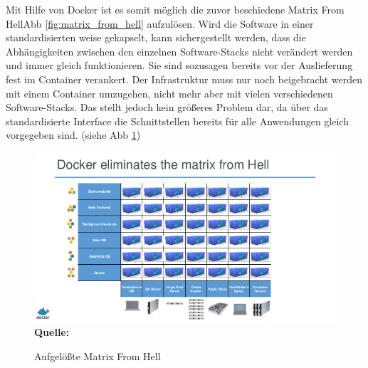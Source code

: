 Mit Hilfe von Docker ist es somit möglich die zuvor beschiedene \glqq Matrix From Hell\grqq Abb \ref{fig:matrix_from_hell} aufzulösen. Wird die Software in einer standardisierten weise gekapselt, kann sichergestellt werden, dass die Abhängigkeiten zwischen den einzelnen Software-Stacks nicht verändert werden und immer gleich funktionieren. Sie sind sozusagen bereits vor der Auslieferung fest im Container verankert. Der Infrastruktur muss nur noch beigebracht werden mit einem Container umzugehen, nicht mehr aber mit vielen verschiedenen Software-Stacks. Das stellt jedoch kein größeres Problem dar, da über das standardisierte Interface die Schnittstellen bereits für alle Anwendungen gleich vorgegeben sind. (siehe Abb \ref{fig:aufgeloesste_matrix_from_hell})
\begin{figure}[htbp]
  \centering  
  \includegraphics[scale=0.7]{img/aufgeloesste_matrix_from_hell.jpg}\\
  \footnotesize\sffamily\textbf{Quelle:} \cite{hykes_docker_2013}
  \caption{Aufgelößte Matrix From Hell}
  \label{fig:aufgeloesste_matrix_from_hell}
\end{figure}

